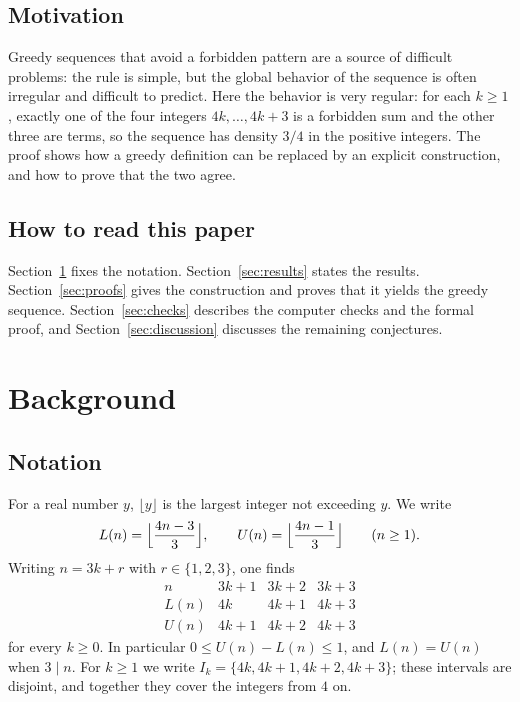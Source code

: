 \documentclass[11pt,a4paper]{article}
\theoremstyle{definition}
\theoremstyle{remark}
\begin{document}
\subsection{Motivation}
Greedy sequences that avoid a forbidden pattern are a source of difficult problems: the rule is simple, but the
global behavior of the sequence is often irregular and difficult to predict. Here the behavior is very
regular: for each $k\ge1$, exactly one of the four integers $4k,\dots,4k+3$ is a forbidden sum and the other three are
terms, so the sequence has density $3/4$ in the positive integers. The proof shows how a greedy definition can
be replaced by an explicit construction, and how to prove that the two agree.

\subsection{How to read this paper}
Section~\ref{sec:background} fixes the notation. Section~\ref{sec:results} states the results.
Section~\ref{sec:proofs} gives the construction and proves that it yields the greedy sequence.
Section~\ref{sec:checks} describes the computer checks and the formal proof, and Section~\ref{sec:discussion} discusses
the remaining conjectures.
\section{Background}\label{sec:background}
\subsection{Notation}
For a real number $y$, $\lfloor y\rfloor$ is the largest integer not exceeding $y$. We write
\[
L(n)=\Bigl\lfloor\frac{4n-3}{3}\Bigr\rfloor,\qquad U(n)=\Bigl\lfloor\frac{4n-1}{3}\Bigr\rfloor\qquad(n\ge1).
\]
Writing $n=3k+r$ with $r\in\{1,2,3\}$, one finds
\begin{equation}\label{eq:LU}
\begin{array}{c|ccc}
n&3k+1&3k+2&3k+3\\ \hline
L(n)&4k&4k+1&4k+3\\
U(n)&4k+1&4k+2&4k+3
\end{array}
\end{equation}
for every $k\ge0$. In particular $0\le U(n)-L(n)\le1$, and $L(n)=U(n)$ when $3\mid n$. For $k\ge1$ we
write $I_k=\{4k,4k+1,4k+2,4k+3\}$; these intervals are disjoint, and together they cover the integers from $4$ on.
\end{document}
